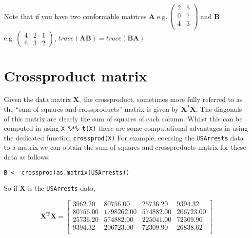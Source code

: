 Note that if you have two conformable matrices $\boldsymbol{A}$ $\mbox{e.g.}\ \left( \begin{array}{rr} 2 & 5 \\ 0 & 7 \\ 4 & 3\\ \end{array} \right)$ and $\boldsymbol{B}$ $\mbox{e.g.}\ \left( \begin{array}{rrr} 4 & 2 & 1 \\ 6 & 3 & 2 \end{array} \right)$, $trace(\boldsymbol{AB}) = trace(\boldsymbol{BA})$



\section{Crossproduct matrix}

Given the data matrix $\boldsymbol{X}$, the crossproduct, sometimes more fully referred to as the ``sum of squares and crossproducts'' matrix is given by $\boldsymbol{X}^{T}\boldsymbol{X}$.   The diagonals of this matrix are clearly the sum of squares of each column.   Whilst this can be computed in \R using \verb+X %*% t(X)+ there are some computational advantages in using the dedicated function \verb+crossprod(X)+   For example, coercing the \verb+USArrests+ data to a matrix we can obtain the sum of squares and crossproducts matrix for these data as follows:
\singlespacing
\begin{verbatim}
B <- crossprod(as.matrix(USArrests))
\end{verbatim}
\onehalfspacing

So if $\boldsymbol{X}$ is the \verb+USArrests+ data, 

\begin{displaymath}
\boldsymbol{X^{T}X} = \left[ \begin{array}{rrrr}
3962.20 & 80756.00 & 25736.20 & 9394.32 \\
80756.00 & 1798262.00 & 574882.00 & 206723.00 \\
25736.20 & 574882.00 & 225041.00 & 72309.90 \\
9394.32 & 206723.00 & 72309.90 & 26838.62 \\
\end{array}
\right]
\end{displaymath}


